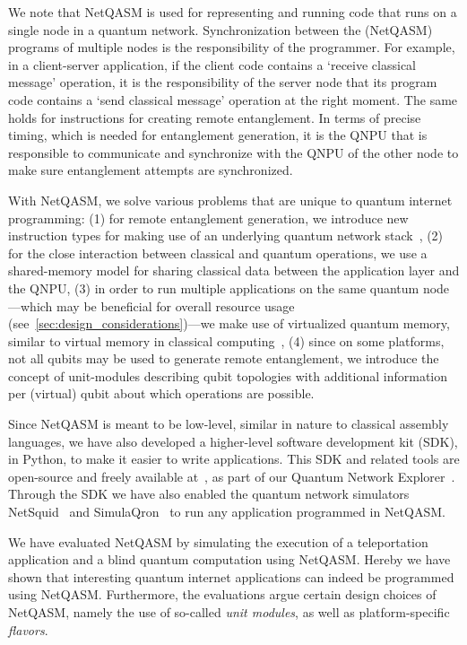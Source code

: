We note that \ac{NetQASM} is used for representing and running code that runs on a single node in a quantum network.
Synchronization between the (\ac{NetQASM}) programs of multiple nodes is the responsibility of the programmer.
For example, in a client-server application, if the client code contains a `receive classical message' operation, it is the responsibility of the server node that its program code contains a `send classical message' operation at the right moment.
The same holds for instructions for creating remote entanglement.
In terms of precise timing, which is needed for entanglement generation, it is the \ac{QNPU} that is responsible to communicate and synchronize with the \ac{QNPU} of the other node to make sure entanglement attempts are synchronized.

With \ac{NetQASM}, we solve various problems that are unique to quantum internet programming:
    (1) for remote entanglement generation, we introduce new instruction types for making use of an underlying quantum network stack~\cite{dahlberg2019linklayer, kozlowski2020networklayer},
    (2) for the close interaction between classical and quantum operations, we use a shared-memory model for sharing classical data between the application layer and the \ac{QNPU},
    (3) in order to run multiple applications on the same quantum node---which may be beneficial for overall resource usage (see~\cref{sec:design_considerations})---we make use of virtualized quantum memory, similar to virtual memory in classical computing~\cite{arpaci2018operating},
    (4) since on some platforms, not all qubits may be used to generate remote entanglement, we introduce the concept of unit-modules describing qubit topologies with additional information per (virtual) qubit about which operations are possible.

Since \ac{NetQASM} is meant to be low-level, similar in nature to classical assembly languages, we have also developed a higher-level software development kit (SDK), in Python, to make it easier to write applications.
This SDK and related tools are open-source and freely available at~\cite{git_netqasm}, as part of our Quantum Network Explorer~\cite{qne_website}.
Through the SDK we have also enabled the quantum network simulators NetSquid~\cite{coopmans2021netsquid} and SimulaQron~\cite{dahlberg2018simulaqron} to run any application programmed in \ac{NetQASM}.

We have evaluated \ac{NetQASM} by simulating the execution of a teleportation application and a blind quantum computation using \ac{NetQASM}.
Hereby we have shown that interesting quantum internet applications can indeed be programmed using \ac{NetQASM}.
Furthermore, the evaluations argue certain design choices of \ac{NetQASM}, namely the use of so-called \textit{unit modules}, as well as platform-specific
\textit{flavors}.

